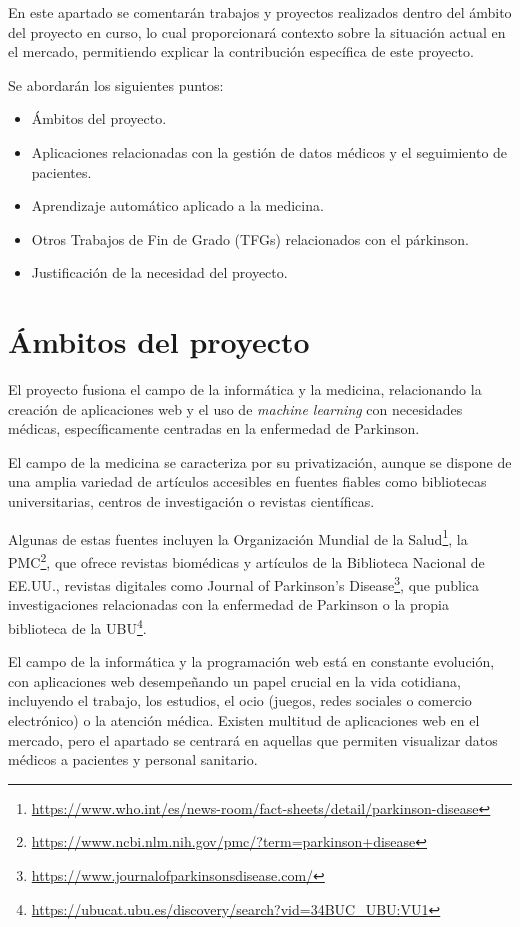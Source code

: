 
En este apartado se comentarán trabajos y proyectos realizados dentro del ámbito del proyecto en curso, lo cual proporcionará contexto sobre la situación actual en el mercado, permitiendo explicar la contribución específica de este proyecto.

Se abordarán los siguientes puntos: 
\begin{itemize}
\item Ámbitos del proyecto.
\item Aplicaciones relacionadas con la gestión de datos médicos y el seguimiento de pacientes.
\item Aprendizaje automático aplicado a la medicina.
\item Otros Trabajos de Fin de Grado (TFGs) relacionados con el párkinson.
\item Justificación de la necesidad del proyecto.
\end{itemize}



\section{Ámbitos del proyecto}
El proyecto fusiona el campo de la informática y la medicina, relacionando la creación de aplicaciones web y el uso de \textit{machine learning} con necesidades médicas, específicamente centradas en la enfermedad de Parkinson.

El campo de la medicina se caracteriza por su privatización, aunque se dispone de una amplia variedad de artículos accesibles en fuentes fiables como bibliotecas universitarias, centros de investigación o revistas científicas.

Algunas de estas fuentes incluyen la Organización Mundial de la Salud\footnote{\url{https://www.who.int/es/news-room/fact-sheets/detail/parkinson-disease}}, la PMC\footnote{\url{https://www.ncbi.nlm.nih.gov/pmc/?term=parkinson+disease}}, que ofrece revistas biomédicas y artículos de la Biblioteca Nacional de EE.UU., revistas digitales como Journal of Parkinson’s Disease\footnote{\url{https://www.journalofparkinsonsdisease.com/}}, que publica investigaciones relacionadas con la enfermedad de Parkinson o la propia biblioteca de la UBU\footnote{\url{https://ubucat.ubu.es/discovery/search?vid=34BUC_UBU:VU1}}.

El campo de la informática y la programación web está en constante evolución, con aplicaciones web desempeñando un papel crucial en la vida cotidiana, incluyendo el trabajo, los estudios, el ocio (juegos, redes sociales o comercio electrónico) o la atención médica. Existen multitud de aplicaciones web en el mercado, pero el apartado se centrará en aquellas que permiten visualizar datos médicos a pacientes y personal sanitario. 



